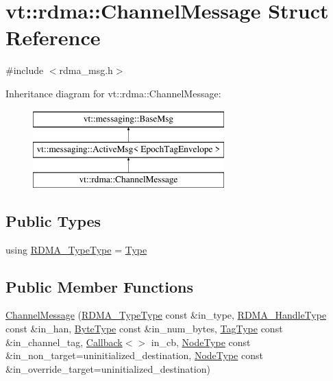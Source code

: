 \hypertarget{structvt_1_1rdma_1_1_channel_message}{}\section{vt\+:\+:rdma\+:\+:Channel\+Message Struct Reference}
\label{structvt_1_1rdma_1_1_channel_message}


{\ttfamily \#include $<$rdma\+\_\+msg.\+h$>$}

Inheritance diagram for vt\+:\+:rdma\+:\+:Channel\+Message\+:\begin{figure}[H]
\begin{center}
\leavevmode
\includegraphics[height=3.000000cm]{structvt_1_1rdma_1_1_channel_message}
\end{center}
\end{figure}
\subsection*{Public Types}
\begin{DoxyCompactItemize}
\item 
using \hyperlink{structvt_1_1rdma_1_1_channel_message_a8cd82de8b91d466fbae2abf28e668c0c}{R\+D\+M\+A\+\_\+\+Type\+Type} = \hyperlink{namespacevt_1_1rdma_ac848e1d9da43db6294bd06f83e5d3946}{Type}
\end{DoxyCompactItemize}
\subsection*{Public Member Functions}
\begin{DoxyCompactItemize}
\item 
\hyperlink{structvt_1_1rdma_1_1_channel_message_ad6ee8a328480b24231dd247397774d49}{Channel\+Message} (\hyperlink{namespacevt_1_1rdma_ac848e1d9da43db6294bd06f83e5d3946}{R\+D\+M\+A\+\_\+\+Type\+Type} const \&in\+\_\+type, \hyperlink{namespacevt_a10442579ec4e7ebef223818e64bcf908}{R\+D\+M\+A\+\_\+\+Handle\+Type} const \&in\+\_\+han, \hyperlink{namespacevt_aab8d55968084610ce3b17057981e9300}{Byte\+Type} const \&in\+\_\+num\+\_\+bytes, \hyperlink{namespacevt_a84ab281dae04a52a4b243d6bf62d0e52}{Tag\+Type} const \&in\+\_\+channel\+\_\+tag, \hyperlink{namespacevt_a36db99df4c973d48b1118a293fff533f}{Callback}$<$$>$ in\+\_\+cb, \hyperlink{namespacevt_a866da9d0efc19c0a1ce79e9e492f47e2}{Node\+Type} const \&in\+\_\+non\+\_\+target=uninitialized\+\_\+destination, \hyperlink{namespacevt_a866da9d0efc19c0a1ce79e9e492f47e2}{Node\+Type} const \&in\+\_\+override\+\_\+target=uninitialized\+\_\+destination)
\end{DoxyCompactItemize}

